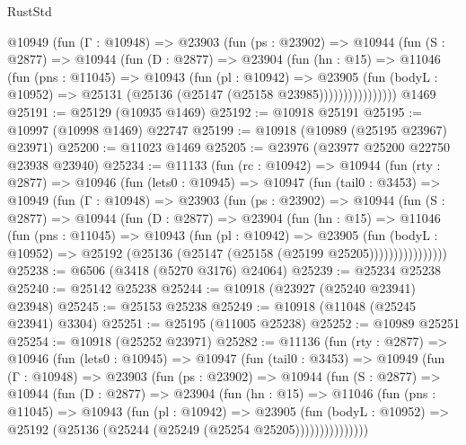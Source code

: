 \begin{lexlean}{RustStd}
\begin{coremodule}
{{{{{{{{{{{{{{{{{{{            @10949
              (fun (Γ : @10948) =>
              @23903
                (fun (ps : @23902) =>
                @10944
                  (fun (S : @2877) =>
                  @10944
                    (fun (D : @2877) =>
                    @23904
                      (fun (hn : @15) =>
                      @11046
                        (fun (pns : @11045) =>
                        @10943
                          (fun (pl : @10942) =>
                          @23905
                            (fun (bodyL : @10952) =>
                            @25131 (@25136 (@25147 (@25158 @23985))))))))))))))))
    @1469
@25191 := @25129 (@10935 @1469)
@25192 := @10918 @25191
@25195 := @10997 (@10998 @1469) @22747
@25199 := @10918 (@10989 (@25195 @23967) @23971)
@25200 := @11023 @1469
@25205 := @23976 (@23977 @25200 @22750 @23938 @23940)
@25234 := @11133
    (fun (rc : @10942) =>
    @10944
      (fun (rty : @2877) =>
      @10946
        (fun (lets0 : @10945) =>
        @10947
          (fun (tail0 : @3453) =>
          @10949
            (fun (Γ : @10948) =>
            @23903
              (fun (ps : @23902) =>
              @10944
                (fun (S : @2877) =>
                @10944
                  (fun (D : @2877) =>
                  @23904
                    (fun (hn : @15) =>
                    @11046
                      (fun (pns : @11045) =>
                      @10943
                        (fun (pl : @10942) =>
                        @23905
                          (fun (bodyL : @10952) =>
                          @25192 (@25136 (@25147 (@25158 (@25199 @25205))))))))))))))))
@25238 := @6506 (@3418 (@5270 @3176) @24064)
@25239 := @25234 @25238
@25240 := @25142 @25238
@25244 := @10918 (@23927 (@25240 @23941) @23948)
@25245 := @25153 @25238
@25249 := @10918 (@11048 (@25245 @23941) @3304)
@25251 := @25195 (@11005 @25238)
@25252 := @10989 @25251
@25254 := @10918 (@25252 @23971)
@25282 := @11136
    (fun (rty : @2877) =>
    @10946
      (fun (lets0 : @10945) =>
      @10947
        (fun (tail0 : @3453) =>
        @10949
          (fun (Γ : @10948) =>
          @23903
            (fun (ps : @23902) =>
            @10944
              (fun (S : @2877) =>
              @10944
                (fun (D : @2877) =>
                @23904
                  (fun (hn : @15) =>
                  @11046
                    (fun (pns : @11045) =>
                    @10943
                      (fun (pl : @10942) =>
                      @23905
                        (fun (bodyL : @10952) =>
                        @25192 (@25136 (@25244 (@25249 (@25254 @25205)))))))))))))))
}}}}}}}}}}}}}}}}}}}
\end{coremodule}
\end{lexlean}
